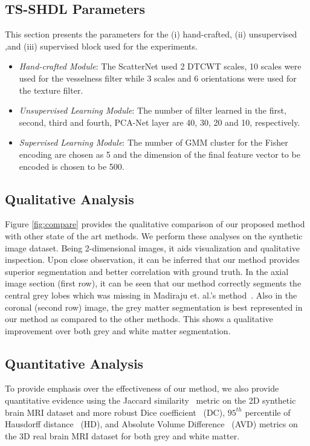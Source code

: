 \documentclass[10pt,twocolumn,letterpaper]{article}
\begin{document}
\subsection{TS-SHDL Parameters}
This section presents the parameters for the (i) hand-crafted, (ii) unsupervised ,and (iii) supervised block used for the experiments. 

\begin{itemize}

\item \textit{Hand-crafted Module}: The ScatterNet used 2 DTCWT scales, 10 scales were used for the vesselness filter while 3 scales and 6 orientations were used for the texture filter.

\item \textit{Unsupervised Learning Module}: The number of filter learned in the first, second, third and fourth, PCA-Net layer are 40, 30, 20 and 10, respectively.

\item \textit{Supervised Learning Module}: The number of GMM cluster for the Fisher encoding are chosen as 5 and the dimension of the final feature vector to be encoded is chosen to be 500. 

\end{itemize}


\subsection{Qualitative Analysis}
\par Figure \ref{fig:compare} provides the qualitative comparison of our proposed method with other state of the art methods. We perform these analyses on the synthetic image dataset. Being 2-dimensional images, it aids visualization and qualitative inspection. Upon close observation, it can be inferred that our method provides superior segmentation and better correlation with ground truth. In the axial image section (first row), it can be seen that our method correctly segments the central grey lobes which was missing in Madiraju et. al.'s method~\cite{madiraju2016level}. Also in the coronal (second row) image, the grey matter segmentation is best represented in our method as compared to the other methods. This shows a qualitative improvement over both grey and white matter segmentation.

\subsection{Quantitative Analysis}\label{sec:quant}
To provide emphasis over the effectiveness of our method, we also provide quantitative evidence using the Jaccard similarity~\cite{vovk2007review} metric on the 2D synthetic brain MRI dataset and more robust Dice coefficient~\cite{cciccek20163d} (DC), $95^{th}$ percentile of Hausdorff distance~\cite{cciccek20163d} (HD), and Absolute Volume Difference~\cite{cciccek20163d} (AVD) metrics on the 3D real brain MRI \cite{mendrik2015mrbrains} dataset for both grey and white matter. 
\end{document}
